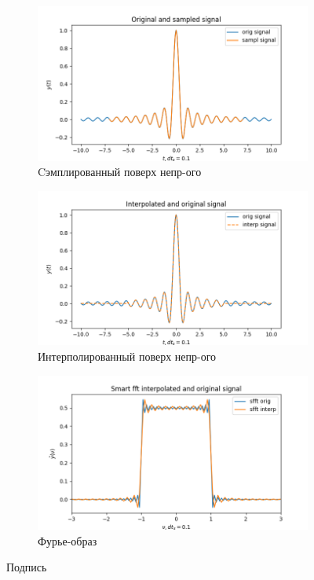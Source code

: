\documentclass[a4paper, 12pt]{article}
\begin{document}
    \begin{figure}[H]
        \centering
        \begin{subfigure}{0.45\textwidth}
            \centering
            \includegraphics[width=\linewidth]{2_sinc.png}
            \caption{Cэмплированный поверх непр-ого}
            \label{fig:sinc2}
        \end{subfigure}
        \hspace{5mm}
        \begin{subfigure}{0.45\textwidth}
            \centering
            \includegraphics[width=\linewidth]{2_isinc.png}
            \caption{Интерполированный поверх непр-ого}
            \label{fig:isinc2}
        \end{subfigure}
        \begin{subfigure}{0.45\textwidth}
            \centering
            \includegraphics[width=\linewidth]{2_fsinc.png}
            \caption{Фурье-образ}
            \label{fig:fisinc2}
        \end{subfigure}
        \caption{Подпись}
        \label{fig:sincs2}
    \end{figure}
\end{document}
